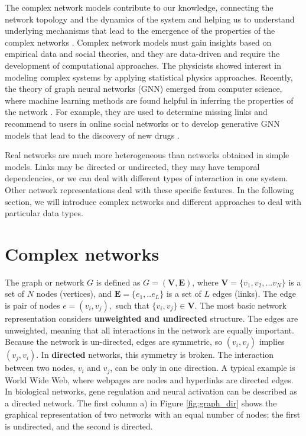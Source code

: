 The complex network models contribute to our knowledge, connecting the network topology and the dynamics of the system and helping us to understand underlying mechanisms that lead to the emergence of the properties of the complex networks \cite{barabasi1999, tadic2001, mitrovic2009, ghoshal2013uncovering}. Complex network models must gain insights based on empirical data and social theories, and they are data-driven and require the development of computational approaches. The physicists showed interest in modeling complex systems by applying statistical physics approaches. Recently, the theory of graph neural networks (GNN) emerged from computer science, where machine learning methods are found helpful in inferring the properties of the network \cite{velickovic2017graph, xu2018powerful, zhou2020graph}. For example, they are used to determine missing links and recommend to users in online social networks \cite{eksombatchai2018pixie, monti1902fake} or to develop generative GNN models that lead to the discovery of new drugs \cite{zhou2019optimization, stokes2020deep}.  

Real networks are much more heterogeneous than networks obtained in simple models. Links may be directed or undirected, they may have temporal dependencies, or we can deal with different types of interaction in one system. Other network representations deal with these specific features. In the following section, we will introduce complex networks and different approaches to deal with particular data types. 

\newpage
\section{Complex networks}

The graph or network $G$ is defined as $G=(\boldsymbol{V}, \boldsymbol{E})$, where $\boldsymbol{V} = \{ v_1, v_2, ... v_N\}$ is a set of $N$ nodes (vertices), and  $\boldsymbol{E} = \{e_1, .. e_L\}$ is a set of $L$ edges (links). The edge is pair of nodes $e = (v_i, v_j), $ such that $\{v_i,v_j\}\in \boldsymbol{V}$. The most basic network representation considers \textbf{unweighted and undirected} structure. The edges are unweighted, meaning that all interactions in the network are equally important. Because the network is un-directed, edges are symmetric, so $(v_i, v_j)$ implies $(v_j, v_i)$. In \textbf{directed} networks, this symmetry is broken. The interaction between two nodes, $v_i$ and $v_j$, can be only in one direction. A typical example is World Wide Web, where webpages are nodes and hyperlinks are directed edges. In biological networks, gene regulation and neural activation can be described as a directed network. The first column a) in Figure \ref{fig:graph_dir} shows the graphical representation of two networks with an equal number of nodes; the first is undirected, and the second is directed. 

